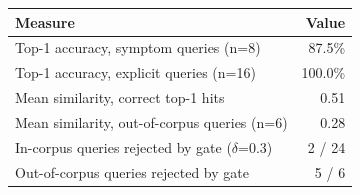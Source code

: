 \begin{tabular}{@{}lr@{}}
\toprule
Measure & Value \\
\midrule
Top-1 accuracy, symptom queries (n=8) & 87.5\% \\
Top-1 accuracy, explicit queries (n=16) & 100.0\% \\
Mean similarity, correct top-1 hits & 0.51 \\
Mean similarity, out-of-corpus queries (n=6) & 0.28 \\
In-corpus queries rejected by gate ($\delta$=0.3) & 2 / 24 \\
Out-of-corpus queries rejected by gate & 5 / 6 \\
\bottomrule
\end{tabular}